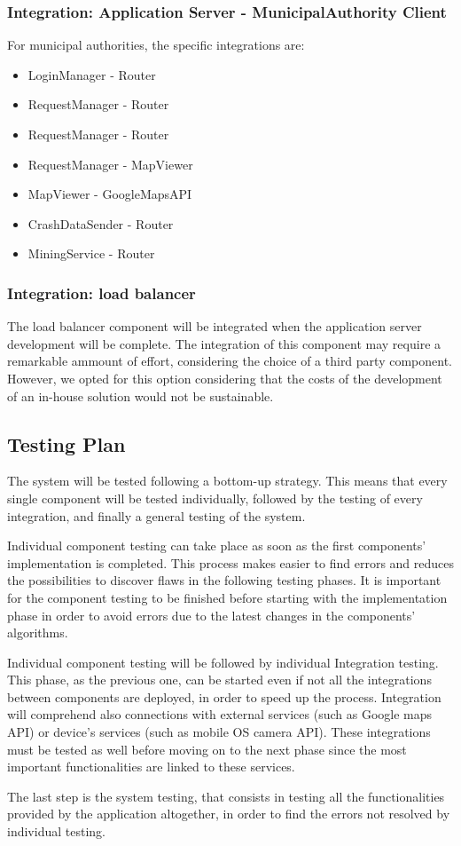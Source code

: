 \subsubsection{Integration: Application Server - MunicipalAuthority Client}
For municipal authorities, the specific integrations are:
\begin{itemize}
	\item LoginManager - Router
	\item RequestManager - Router
	\item RequestManager - Router
	\item RequestManager - MapViewer 
	\item MapViewer - GoogleMapsAPI
	\item CrashDataSender - Router	
	\item MiningService - Router
\end{itemize}

\subsubsection{Integration: load balancer}
The load balancer component will be integrated when the application server development will be complete. The integration of this component may require a remarkable ammount of effort, considering the choice of a third party component. However, we opted for this option considering that the costs of the development of an in-house solution would not be sustainable.

\subsection{Testing Plan}
The system will be tested following a bottom-up strategy.
This means that every single component will be tested individually, followed by the testing of every integration, and finally a general testing of the system.	\par
Individual component testing can take place as soon as the first components' implementation is completed.
This process makes easier to find errors and reduces the possibilities to discover flaws in the following testing phases.
It is important for the component testing to be finished before starting with the implementation phase in order to avoid errors due to the latest changes in the components' algorithms. \par
Individual component testing will be followed by individual Integration testing.
This phase, as the previous one, can be started even if not all the integrations between components are deployed, in order to speed up the process.
Integration will comprehend also connections with external services (such as Google maps API) or device's services (such as mobile OS camera API). These integrations must be tested as well before moving on to the next phase since the most important functionalities are linked to these services. \par
The last step is the system testing, that consists in testing all the functionalities provided by the application altogether, in order to find the errors not resolved by individual testing.